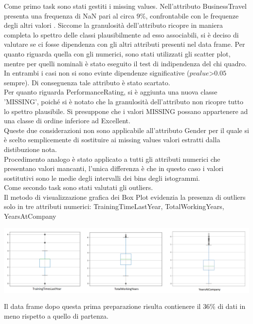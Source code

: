 \documentclass[english]{article}
\begin{document}
Come primo task sono stati gestiti i missing values.
Nell'attributo BusinessTravel presenta una frequenza di NaN pari al circa $9\%$, confrontabile con le frequenze degli altri valori . Siccome la granulosità dell'attributo ricopre in maniera completa lo spettro delle classi plausibilmente ad esso associabili, si è deciso di valutare se ci fosse dipendenza con gli altri attributi presenti nel data frame. Per quanto riguarda quella con gli numerici, sono stati utilizzati gli scatter plot, mentre per quelli nominali è stato eseguito il test di indipendenza del chi quadro. In entrambi i casi non si sono evinte dipendenze significative ($p value $>$ 0.05$ sempre). Di conseguenza tale attributo è stato scartato.\\
Per quanto riguarda PerformanceRating, si è aggiunta una nuova classe 'MISSING', poiché si è notato che la granulosità dell'attributo non ricopre tutto lo spettro plausibile. Si presuppone che i valori MISSING possano appartenere ad una classe di ordine inferiore ad Excellent.\\
Queste due considerazioni non sono applicabile all'attributo Gender per il quale si è scelto semplicemente di sostituire ai missing values valori estratti dalla distibuzione nota.\\
Procedimento analogo è stato applicato a tutti gli attributi numerici che presentano valori mancanti, l'unica differenza è che in questo caso i valori sostitutivi sono le medie degli intervalli dei bins degli istogrammi.\\ %
Come secondo task sono stati valutati gli outliers.\\
Il metodo di visualizzazione grafica dei Box Plot evidenzia la presenza di outliers solo in tre attributi numerici: TrainingTimeLastYear, TotalWorkingYears, YearsAtCompany
\begin{center}
\includegraphics[scale=1]{boxplot.png}
\end{center}
 Il data frame dopo questa prima preparazione risulta contienere il $36\%$ di dati in meno rispetto a quello di partenza.\\
\end{document}
